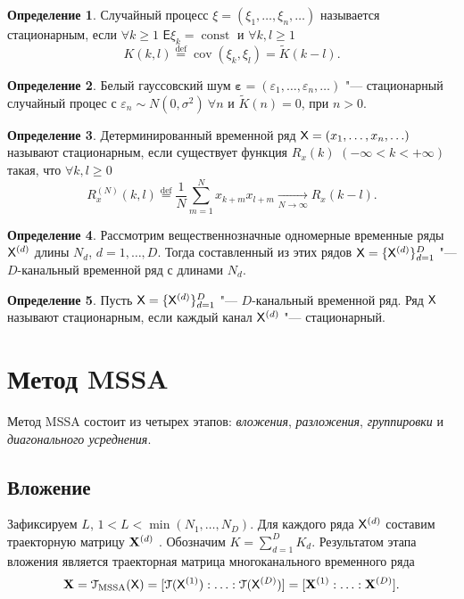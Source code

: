 \documentclass[specialist,
substylefile = spbu_report.rtx,
subf,href,colorlinks=true, 12pt]{disser}
\theoremstyle{definition}
\newtheorem{definition}{Определение}
\begin{document}
\begin{definition}
	Случайный процесс $\xi=(\xi_1,\ldots, \xi_n,\ldots)$ называется стационарным, если $\forall k\geqslant1$ $\mathsf E\xi_k=\operatorname{const}$ и $\forall k,l\geqslant1$
	\[
	K(k, l)\overset{\text{def}}=\operatorname{cov}(\xi_k, \xi_l)= \widetilde{K}(k-l).
	\]
\end{definition}
\begin{definition}
	Белый гауссовский шум $\boldsymbol{\varepsilon}=(\varepsilon_1,\ldots,\varepsilon_n,\ldots)$ "--- стационарный случайный процес с $\varepsilon_n\sim N(0, \sigma^2)~\forall n$ и $\widetilde K(n)=0$, при $n>0$.
\end{definition}
\begin{definition}
	Детерминированный временной ряд $\mathsf{X}=(x_1,\ldots,x_n,\ldots)$ называют стационарным, если существует функция $R_x(k)$ $(-\infty<k<+\infty)$ такая, что $\forall k,l\geqslant0$
	\begin{equation*}
		R_x^{(N)}(k,l)\overset{\text{def}}{=}\frac{1}{N}\sum_{m=1}^Nx_{k+m}x_{l+m}\underset{N\to\infty}\longrightarrow R_x(k - l).
	\end{equation*}
\end{definition}
\begin{definition}
	Рассмотрим вещественнозначные одномерные временные ряды $\mathsf{X}^{(d)}$ длины $N_d$, $d=1,\ldots,D$. Тогда составленный из этих рядов $\mathsf{X}=\{\mathsf{X}^{(d)}\}_{d=1}^D$ "--- $D$-канальный временной ряд с длинами $N_d$.
\end{definition}
\begin{definition}
	Пусть $\mathsf{X}=\{\mathsf{X}^{(d)}\}_{d=1}^D$ "--- $D$-канальный временной ряд. Ряд $\mathsf{X}$ называют стационарным, если каждый канал $\mathsf{X}^{(d)}$ "--- стационарный.
\end{definition}

\section{Метод MSSA}\label{sect:mssa}
Метод MSSA состоит из четырех этапов: \emph{вложения}, \emph{разложения}, \emph{группировки} и \emph{диагонального усреднения}.

\subsection{Вложение}\label{sect:embedding}
Зафиксируем $L$, $1<L<\min(N_1,\ldots,N_D)$. Для каждого ряда $\mathsf{X}^{(d)}$ составим траекторную матрицу $\mathbf{X}^{(d)}$ . Обозначим $K=\sum_{d=1}^D K_d$. Результатом этапа вложения является траекторная матрица многоканального временного ряда
\begin{equation}\label{eq:embedding_mssa}
	\mathbf{X}=\EuScript{T}_{\text{MSSA}}(\mathsf{X})=[\EuScript{T}(\mathsf{X}^{(1)}):\ldots:\EuScript{T}(\mathsf{X}^{(D)})]=[\mathbf{X}^{(1)}:\ldots:\mathbf{X}^{(D)}].
\end{equation}
\end{document}
